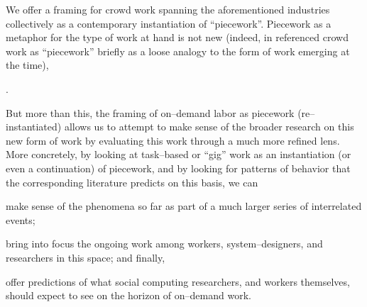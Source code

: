 \documentclass[trackingWork]{subfiles}
\begin{document}
We offer a framing for crowd work spanning the aforementioned industries
collectively as a contemporary instantiation of ``piecework''.
Piecework as a metaphor for the type of work at hand is not new
(indeed,
\citeauthor{crowdworkFuture}
in
\citeyear{crowdworkFuture}
referenced crowd work as ``piecework'' briefly
as a loose analogy to the form of work emerging at the time),

\cite{crowdworkFuture}.


But more than this,
the framing of on--demand labor as piecework (re--instantiated)
allows us to attempt to make sense of the broader research on this new form of work
by evaluating this work through a much more refined lens.
More concretely, by looking at task--based or ``gig'' work as
an instantiation (or even a continuation) of piecework,
and by looking for patterns of behavior that the corresponding literature predicts
on this basis, we can
\begin{inlinelist}
  \item make sense of the phenomena so far as part of a much larger series of interrelated events;
  \item bring into focus the ongoing work among workers, system--designers, and researchers in this space; and finally,
  \item offer predictions of what social computing researchers,
        and workers themselves,
        should expect to see on the horizon of on--demand work.
\end{inlinelist}
\end{document}
